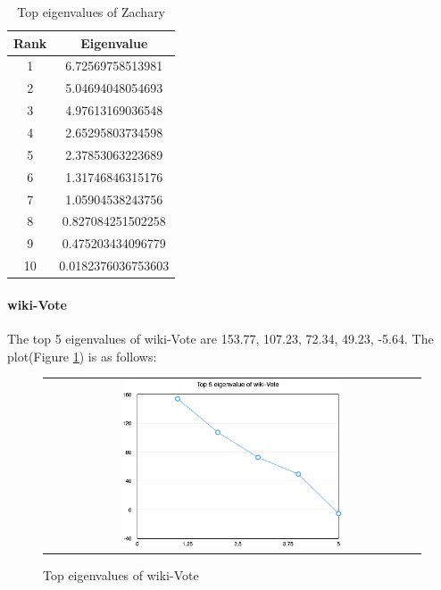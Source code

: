 \begin{table}
\begin{center}
\begin{tabular}{| c | c |}
    \hline
    Rank & Eigenvalue \\ \hline
    1 & 6.72569758513981 \\ \hline
    2 & 5.04694048054693 \\ \hline
    3 & 4.97613169036548 \\ \hline
    4 & 2.65295803734598 \\ \hline
    5 & 2.37853063223689 \\ \hline
    6 & 1.31746846315176 \\ \hline
    7 & 1.05904538243756 \\ \hline
    8 & 0.827084251502258 \\ \hline
    9 & 0.475203434096779 \\ \hline
    10 & 0.0182376036753603 \\ \hline
\end{tabular}
\end{center}
\caption{Top eigenvalues of Zachary}
\label{t5:sql}
\end{table}

\paragraph{wiki-Vote}
The top 5 eigenvalues of wiki-Vote are 153.77, 107.23, 72.34, 49.23, -5.64. The plot(Figure \ref{t5:wikivote}) is as follows:
\begin{figure}[!htbf]
\begin{center}
\begin{tabular}{c}
     \includegraphics[width=0.6\textwidth]{FIG/t5_wikivote.png}\\
\end{tabular}
\caption{Top eigenvalues of wiki-Vote}
\label{t5:wikivote}
\end{center}
\end{figure}

